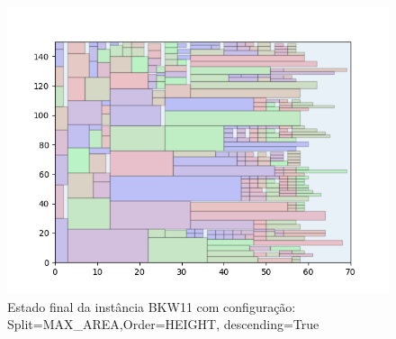 \begin{figure}[H]
    \centering
    \caption[]{Estado final da instância BKW11 com configuração: Split=MAX_AREA,Order=HEIGHT, descending=True}
    \label{fig:bkw11-max_area-height-true}
    \includegraphics[scale=0.5]{output/figures/bkw/bkw11/max_area/height/true/000}
\end{figure}
